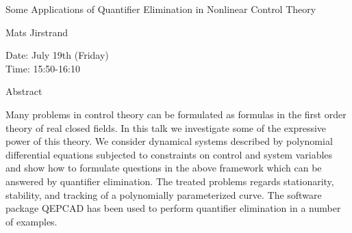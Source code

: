 \begin{center}
\LARGE
Some Applications of Quantifier Elimination in Nonlinear
                        Control Theory

\end{center}

\begin{center}
\Large
Mats Jirstrand

\end{center}

\noindent
Date: July 19th (Friday)\\
Time:  15:50-16:10\\

\begin{center}
\large
Abstract
\end{center}

Many problems in control theory can be formulated as formulas in the first order theory of real
closed fields. In this talk we investigate some of the expressive power of this theory. We consider
dynamical systems described by polynomial differential equations subjected to constraints on
control and system variables and show how to formulate questions in the above framework which
can be answered by quantifier elimination. The treated problems regards stationarity, stability, and
tracking of a polynomially parameterized curve. The software package QEPCAD has been used to
perform quantifier elimination in a number of examples. 

